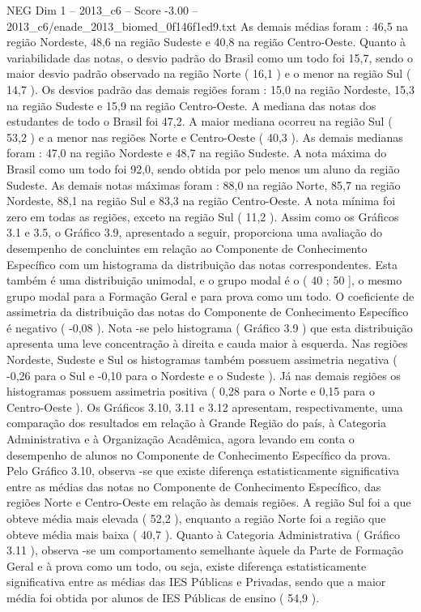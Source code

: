 \begin{textsample}{NEG Dim 1 – 2013\_c6 – Score -3.00 – 2013\_c6/enade\_2013\_biomed\_0f146f1ed9.txt}
As demais médias foram : 46,5 na região Nordeste, 48,6 na região Sudeste e 40,8 na região Centro-Oeste.
Quanto à variabilidade das notas, o desvio padrão do Brasil como um todo foi 15,7, sendo o maior desvio padrão observado na região Norte ( 16,1 ) e o menor na região Sul ( 14,7 ).
Os desvios padrão das demais regiões foram : 15,0 na região Nordeste, 15,3 na região Sudeste e 15,9 na região Centro-Oeste.
A mediana das notas dos estudantes de todo o Brasil foi 47,2.
A maior mediana ocorreu na região Sul ( 53,2 ) e a menor nas regiões Norte e Centro-Oeste ( 40,3 ).
As demais medianas foram : 47,0 na região Nordeste e 48,7 na região Sudeste.
A nota máxima do Brasil como um todo foi 92,0, sendo obtida por pelo menos um aluno da região Sudeste.
As demais notas máximas foram : 88,0 na região Norte, 85,7 na região Nordeste, 88,1 na região Sul e 83,3 na região Centro-Oeste.
A nota mínima foi zero em todas as regiões, exceto na região Sul ( 11,2 ).
Assim como os Gráficos 3.1 e 3.5, o Gráfico 3.9, apresentado a seguir, proporciona uma avaliação do desempenho de concluintes em relação ao Componente de Conhecimento Específico com um histograma da distribuição das notas correspondentes.
Esta também é uma distribuição unimodal, e o grupo modal é o ( 40 ; 50 ], o mesmo grupo modal para a Formação Geral e para prova como um todo.
O coeficiente de assimetria da distribuição das notas do Componente de Conhecimento Específico é negativo ( -0,08 ).
Nota -se pelo histograma ( Gráfico 3.9 ) que esta distribuição apresenta uma leve concentração à direita e cauda maior à esquerda.
Nas regiões Nordeste, Sudeste e Sul os histogramas também possuem assimetria negativa ( -0,26 para o Sul e -0,10 para o Nordeste e o Sudeste ).
Já nas demais regiões os histogramas possuem assimetria positiva ( 0,28 para o Norte e 0,15 para o Centro-Oeste ).
Os Gráficos 3.10, 3.11 e 3.12 apresentam, respectivamente, uma comparação dos resultados em relação à Grande Região do país, à Categoria Administrativa e à Organização Acadêmica, agora levando em conta o desempenho de alunos no Componente de Conhecimento Específico da prova.
Pelo Gráfico 3.10, observa -se que existe diferença estatisticamente significativa entre as médias das notas no Componente de Conhecimento Específico, das regiões Norte e Centro-Oeste em relação às demais regiões.
A região Sul foi a que obteve média mais elevada ( 52,2 ), enquanto a região Norte foi a região que obteve média mais baixa ( 40,7 ).
Quanto à Categoria Administrativa ( Gráfico 3.11 ), observa -se um comportamento semelhante àquele da Parte de Formação Geral e à prova como um todo, ou seja, existe diferença estatisticamente significativa entre as médias das IES Públicas e Privadas, sendo que a maior média foi obtida por alunos de IES Públicas de ensino ( 54,9 ).

\end{textsample}
